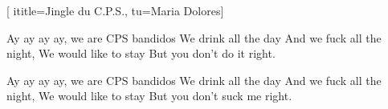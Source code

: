  [
ititle={Jingle du C.P.S.},
tu={Maria Dolores}]

\beginverse
Ay ay ay ay, we are CPS bandidos
We drink all the day
And we fuck all the night,
We would like to stay
But you don't do it right.
\endverse

\beginverse
Ay ay ay ay, we are CPS bandidos
We drink all the day
And we fuck all the night,
We would like to stay
But you don't suck me right.
\endverse
\endsong